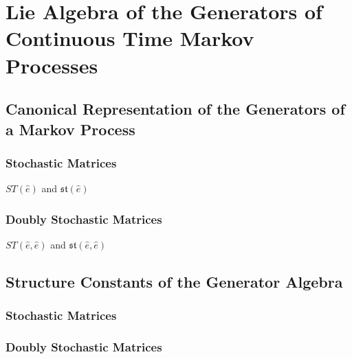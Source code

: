 \chapter{Lie Algebra of the Generators of Continuous Time Markov Processes}
\section{Canonical Representation of the Generators of a Markov Process}
\subsection{Stochastic Matrices}
$ST(\hat{e})$ and $\mathfrak{st}(\hat{e})$
\subsection{Doubly Stochastic Matrices}
$ST(\hat{e},\hat{e})$ and $\mathfrak{st}(\hat{e},\hat{e})$
\section{Structure Constants of the Generator Algebra}
\subsection{Stochastic Matrices}
\subsection{Doubly Stochastic Matrices}